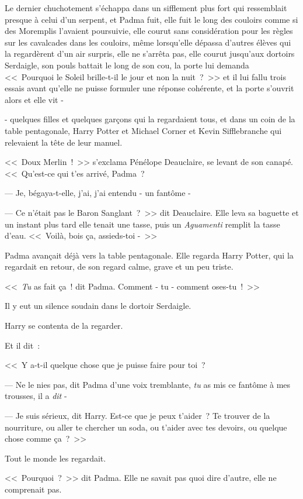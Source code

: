 Le dernier chuchotement s'échappa dans un sifflement plus fort qui ressemblait presque à celui d'un serpent, et Padma fuit, elle fuit le long des couloirs comme si des Moremplis l'avaient poursuivie, elle courut sans considération pour les règles sur les cavalcades dans les couloirs, même lorsqu'elle dépassa d'autres élèves qui la regardèrent d'un air surpris, elle ne s'arrêta pas, elle courut jusqu'aux dortoirs Serdaigle, son pouls battait le long de son cou, la porte lui demanda <<~Pourquoi le Soleil brille-t-il le jour et non la nuit~?~>> et il lui fallu trois essais avant qu'elle ne puisse formuler une réponse cohérente, et la porte s'ouvrit alors et elle vit -

- quelques filles et quelques garçons qui la regardaient tous, et dans un coin de la table pentagonale, Harry Potter et Michael Corner et Kevin Sifflebranche qui relevaient la tête de leur manuel.

<<~Doux Merlin~!~>> s'exclama Pénélope Deauclaire, se levant de son canapé. <<~Qu'est-ce qui t'es arrivé, Padma~?

--- Je, bégaya-t-elle, j'ai, j'ai entendu - un fantôme -

--- Ce n'était pas le Baron Sanglant~?~>> dit Deauclaire. Elle leva sa baguette et un instant plus tard elle tenait une tasse, puis un \emph{Aguamenti} remplit la tasse d'eau. <<~Voilà, bois ça, assieds-toi -~>>

Padma avançait déjà vers la table pentagonale. Elle regarda Harry Potter, qui la regardait en retour, de son regard calme, grave et un peu triste.

<<~\emph{Tu} as fait ça~! dit Padma. Comment - tu - comment oses-tu~!~>>

Il y eut un silence soudain dans le dortoir Serdaigle.

Harry se contenta de la regarder.

Et il dit~:

<<~Y a-t-il quelque chose que je puisse faire pour toi~?

--- Ne le nies pas, dit Padma d'une voix tremblante, \emph{tu} as mis ce fantôme à mes trousses, il a \emph{dit} -

--- Je suis sérieux, dit Harry. Est-ce que je peux t'aider~? Te trouver de la nourriture, ou aller te chercher un soda, ou t'aider avec tes devoirs, ou quelque chose comme ça~?~>>

Tout le monde les regardait.

<<~Pourquoi~?~>> dit Padma. Elle ne savait pas quoi dire d'autre, elle ne comprenait pas.

